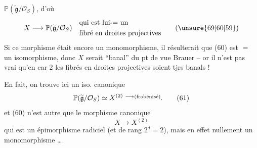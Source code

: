 $\mathbb P(\widetilde{\mathfrak g}/\mathcal O_S)$,  d'où
\[
X\longrightarrow\mathbb P(\widetilde{\mathfrak g}/\mathcal O_S)\quad
\begin{aligned}&\text{qui est lui-$=$ un}\\&\text{fibré en droites projectives}\end{aligned}\tag*{(\unsure{69|60|59})}
\]
Si  ce morphisme  était encore un monomorphisme, il  résulterait que (60) est $=$ un isomorphisme, donc $X$ serait ``banal'' du pt de vue Brauer -- or il n'est pas vrai qu'en car $2$ les fibrés en droites projectives soient tjrs banals !

En fait, on trouve ici un iso. canonique
\[
\mathbb P(\widetilde{\mathfrak g}/\mathcal O_S)\simeq X^{(2)}\;\raisebox{.65ex}{\(\scriptstyle\longrightarrow\text{(frobénisé)}\)}.\tag*{(61)}
\]
et (60) n'est autre que le morphisme canonique
\[
X\longrightarrow X^{(2)}
\]
qui est un épimorphisme radiciel (et   de rang $2^d=2$), mais en effet nullement un monomorphisme \ldots.
